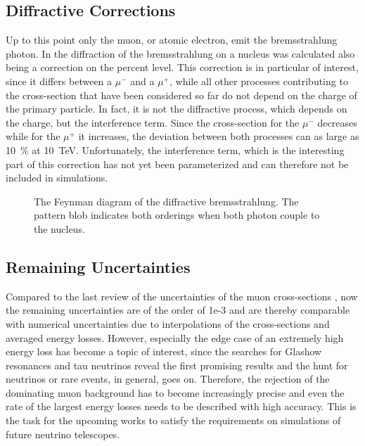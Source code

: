 \subsection{Diffractive Corrections}

Up to this point only the muon, or atomic electron, emit the bremsstrahlung photon.
In \cite{Kelner99BremsDiffract} the diffraction of the bremsstrahlung on a nucleus was calculated also being a correction on the percent level.
This correction is in particular of interest, since it differs between a $\mu^-$ and a $\mu^+$, while all other processes contributing to the cross-section that have been considered so far do not depend on the charge of the primary particle.
In fact, it is not the diffractive process, which depends on the charge, but the interference term.
Since the cross-section for the $\mu^-$ decreases while for the $\mu^+$ it increases, the deviation between both processes can as large as \SI{10}{\%} at \SI{10}{TeV}.
Unfortunately, the interference term, which is the interesting part of this correction has not yet been parameterized and can therefore not be included in simulations.
\begin{figure}
    \centering
    
    \caption{The Feynman diagram of the diffractive bremsstrahlung. The pattern blob indicates both orderings when both photon couple to the nucleus.}
    \label{fig:feyn_brems_diffract}
\end{figure}

\subsection{Remaining Uncertainties}

Compared to the last review of the uncertainties of the muon cross-sections \cite{Kokoulin99}, now the remaining uncertainties are of the order of 1e-3 and are thereby comparable with numerical uncertainties due to interpolations of the cross-sections and averaged energy losses.
However, especially the edge case of an extremely high energy loss has become a topic of interest, since the searches for Glashow resonances and tau neutrinos reveal the first promising results and the hunt for neutrinos or rare events, in general, goes on.
Therefore, the rejection of the dominating muon background has to become increasingly precise and even the rate of the largest energy losses needs to be described with high accuracy.
This is the task for the upcoming works to satisfy the requirements on simulations of future neutrino telescopes.

